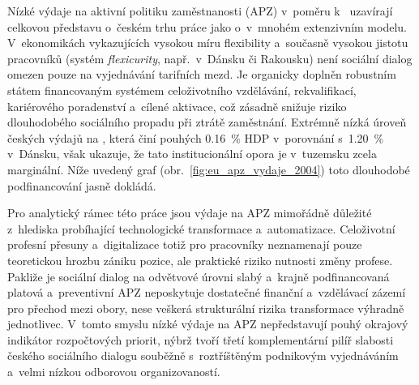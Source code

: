Nízké výdaje na aktivní politiku zaměstnanosti (\ac{APZ}) v~poměru k~ uzavírají celkovou představu o~českém trhu práce jako o~v~mnohém extenzivním modelu. V~ekonomikách vykazujících vysokou míru flexibility a~současně vysokou jistotu pracovníků (systém \textit{flexicurity}, např.~v~Dánsku či Rakousku) není sociální dialog omezen pouze na vyjednávání tarifních mezd. Je organicky doplněn robustním státem financovaným systémem celoživotního vzdělávání, rekvalifikací, kariérového poradenství a~cílené aktivace, což zásadně snižuje riziko dlouhodobého sociálního propadu při ztrátě zaměstnání. Extrémně nízká úroveň českých výdajů na , která činí pouhých \SI{0,16}{\percent} \acs{HDP} v~porovnání s~\SI{1,20}{\percent} v~Dánsku, však ukazuje, že tato institucionální opora je v~tuzemsku zcela marginální. Níže uvedený graf (obr.~\ref{fig:eu_apz_vydaje_2004}) toto dlouhodobé podfinancování jasně dokládá.\par



Pro analytický rámec této práce jsou výdaje na \acs{APZ} mimořádně důležité z~hlediska probíhající technologické transformace a~automatizace. Celoživotní profesní přesuny a~digitalizace totiž pro pracovníky neznamenají pouze teoretickou hrozbu zániku pozice, ale praktické riziko nutnosti změny profese. Pakliže je sociální dialog na odvětvové úrovni slabý a~krajně podfinancovaná platová a~preventivní \acs{APZ} neposkytuje dostatečné finanční a~vzdělávací zázemí pro přechod mezi obory, nese veškerá strukturální rizika transformace výhradně jednotlivec. V~tomto smyslu nízké výdaje na \acs{APZ} nepředstavují pouhý okrajový indikátor rozpočtových priorit, nýbrž tvoří třetí komplementární pilíř slabosti českého sociálního dialogu souběžně s~roztříštěným podnikovým vyjednáváním a~velmi nízkou odborovou organizovaností.\par
